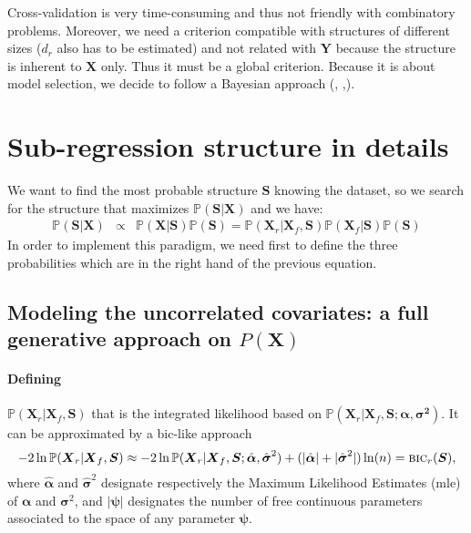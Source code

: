 \documentclass[12pt,a4paper]{report}
\begin{document}
Cross-validation is very time-consuming and thus not friendly with combinatory problems. Moreover, we need a criterion compatible with structures of different sizes ($d_r$ also has to be estimated) and not related with $\boldsymbol{Y}$ because the structure is inherent to $\boldsymbol{X}$ only. Thus it must be a global criterion. 	
Because it is about model selection, we decide to follow a Bayesian approach (\cite{raftery1995bayesian}, \cite{andrieu1999joint},\cite{chipman2001practical}).  
	

	

\section{Sub-regression structure in details}
We want to find the most probable structure $\boldsymbol{S}$ knowing the dataset, so we search for the structure that maximizes $\mathbb{P}(\boldsymbol{S}|\boldsymbol{X})$ and we have:	
	\begin{eqnarray}
	 \label{approxBIC} \mathbb{P}(\boldsymbol{S}|\boldsymbol{X})&\propto & \mathbb{P}(\boldsymbol{X}|\boldsymbol{S})\mathbb{P}(\boldsymbol{S})
	=\mathbb{P}(\boldsymbol{X}_r|\boldsymbol{X}_f,\boldsymbol{S})\mathbb{P}(\boldsymbol{X}_f|\boldsymbol{S})\mathbb{P}(\boldsymbol{S})
	\end{eqnarray}
In order to implement this paradigm, we need first to define the three probabilities which are in the right hand of the previous equation.
	\subsection{Modeling the uncorrelated covariates: a full generative approach on $P(\boldsymbol{X})$} \label{sectionfullgen}
	

\paragraph{Defining} $\mathbb{P}(\boldsymbol{X}_r|\boldsymbol{X}_f,\boldsymbol{S})$ that is the integrated likelihood based on $\mathbb{P}(\boldsymbol{X}_r | \boldsymbol{X}_f,\boldsymbol{S};\boldsymbol{\alpha},\boldsymbol{\sigma^2})$. It can be approximated by a {\sc bic}-like approach \cite{Sch1978}
\begin{equation}
-2\ln \mathbb{P}(\boldsymbol{X}_r|\boldsymbol{X}_f,\boldsymbol{S}) \approx -2\ln \mathbb{P}(\boldsymbol{X}_r | \boldsymbol{X}_f,\boldsymbol{S};\hat{\boldsymbol{\alpha}},\hat{\boldsymbol{\sigma}}^2) + (|\hat{\boldsymbol{\alpha}}| + |\hat{\boldsymbol{\sigma}}^2|) \ln(n) = \mbox{{\sc bic}}_r(\boldsymbol{S}), \nonumber
\end{equation}
where $\hat{\boldsymbol{\alpha}}$ and $\hat{\boldsymbol{\sigma}}^2$ designate respectively the Maximum Likelihood Estimates ({\sc mle}) of ${\boldsymbol{\alpha}}$ and ${\boldsymbol{\sigma}}^2$, and $|\boldsymbol{\psi}|$ designates the number of free continuous parameters associated to the space of any parameter $\boldsymbol{\psi}$.
\end{document}
